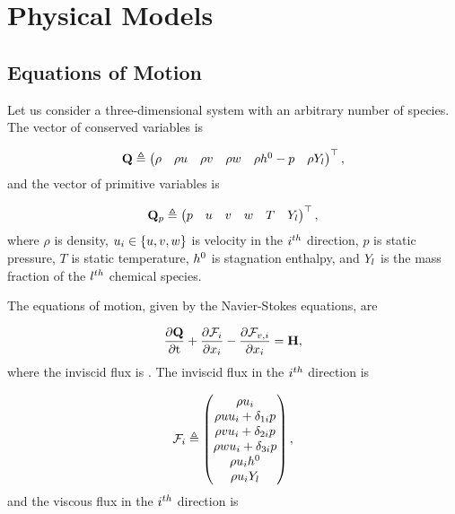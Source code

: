 \section{Physical Models}

\subsection{Equations of Motion}

Let us consider a three-dimensional system with an arbitrary number of species. The vector of conserved variables is

\begin{equation}
	\mathbf{Q} \triangleq \begin{pmatrix}
		\rho & \rho u & \rho v & \rho w & \rho h^0 - p & \rho Y_{l}
	\end{pmatrix}^\top,
\end{equation}
and the vector of primitive variables is

\begin{equation}
	\mathbf{Q}_p \triangleq \begin{pmatrix}
		p & u & v & w & T & Y_{l}
	\end{pmatrix}^\top,
\end{equation}
where $\rho$ is density, $u_{i} \in \{u, v, w\}$ is velocity in the $i^{th}$ direction, $p$ is static pressure, $T$ is static temperature, $h^0$ is stagnation enthalpy, and $Y_{l}$ is the mass fraction of the $l^{th}$ chemical species.

The equations of motion, given by the Navier-Stokes equations, are

\begin{equation}
	\frac{\partial \mathbf{Q}}{\partial \text{t}} + \frac{\partial \mathcal{F}_{i}}{\partial x_{i}} - \frac{\partial \mathcal{F}_{v,i}}{\partial x_{i}} = \mathbf{H},
\end{equation}
where the inviscid flux is \invFlux. The inviscid flux in the $i^{th}$ direction is

\begin{equation}
	\mathcal{F}_{i} \triangleq \begin{pmatrix}
		\rho u_{i} \\
		\rho u u_{i} + \delta_{1 i} p \\
		\rho v u_{i} + \delta_{2 i} p \\
		\rho w u_{i} + \delta_{3 i} p \\
		\rho u_{i} h^0 \\ 
		\rho u_{i} Y_{l}
	\end{pmatrix},
\end{equation}
and the viscous flux in the $i^{th}$ direction is

